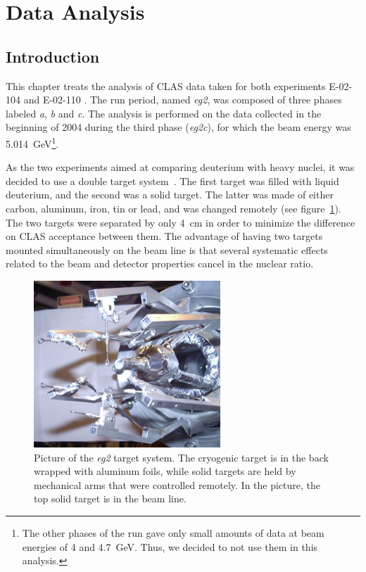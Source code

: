 \section{Data Analysis}
\label{chap:analysis}

\subsection{Introduction}

This chapter treats the analysis of CLAS data taken for both 
experiments E-02-104 \cite{Brooks:2002aa} and E-02-110 \cite{Hafidi:2002aa}.
The run period, named {\it eg2}, was composed of three phases 
labeled {\it a}, {\it b} and {\it c}. The analysis is performed on the data 
collected in the beginning of 2004 during the third phase ({\it eg2c}), for 
which the beam energy was 5.014~GeV\footnote{The other phases of the run 
gave only small amounts of data at beam energies of 4 and 4.7~GeV. Thus, we 
decided to not use them in this analysis.}.

As the two experiments aimed at comparing deuterium with heavy nuclei, it was 
decided to use a double target system~\cite{Hakobyan:2008zz}. The first target 
was filled with liquid deuterium, and the second was a solid target. The 
latter was made of either carbon, aluminum, iron, tin or lead, and was changed 
remotely (see figure~\ref{fig:phototarget}). The two targets were separated by 
only 4~cm in order to minimize the difference on CLAS acceptance between them. 
The advantage of having two targets mounted simultaneously on the beam line is 
that several systematic effects related to the beam and detector properties 
cancel in the nuclear ratio.

\begin{figure}[htbp]
\centering
\includegraphics[width=7cm] {chap5-fig/PhTar.jpg} 
\caption {Picture of the {\it eg2} target system. The cryogenic target is 
in the back wrapped with aluminum foils, while solid targets are held by mechanical arms that were controlled remotely. In the picture, the top solid target is in the beam line.}
\label{fig:phototarget}
\end{figure}

